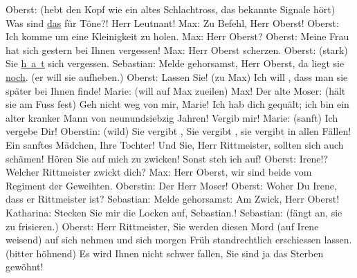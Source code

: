 \begin{ledgroupsized}[t]{13cm}
           \pstart
           Oberst: (hebt den Kopf wie ein altes Schlachtross, das bekannte Signale hört) Was
               sind \uline{das} für Töne?! Herr Leutnant!\pend
           \pstart
           Max: Zu Befehl, Herr Oberst!\pend
           \pstart
           Oberst: Ich komme um eine Kleinigkeit zu holen.\pend
           \pstart
           Max: Herr Oberst?\pend
           \pstart
           {\pb}Oberst: Meine Frau hat sich
               gestern bei Ihnen vergessen!\pend
           \pstart
           Max: Herr Oberst scherzen.\pend
           \pstart
           Oberst: (stark) Sie 
               \uline{h a t}
                sich vergessen.\pend
           \pstart
           Sebastian: Melde gehorsamst, Herr Oberst, da liegt sie \uline{noch}. (er will sie aufheben.)\pend
           \pstart
           Oberst: Lassen Sie! (zu Max) Ich will , dass man
               sie später bei Ihnen finde!\pend
           \pstart
           Marie: (will auf Max zueilen) Max!\pend
           \pstart
           Der alte Moser: (hält sie am Fuss fest) Geh nicht weg von mir, Marie! Ich hab dich
               gequält; ich bin ein alter kranker Mann von neunundsiebzig Jahren! Vergib mir!\pend
           \pstart
           Marie: (sanft) Ich vergebe Dir!\pend
           \pstart
           Oberstin: (wild) Sie vergibt , Sie vergibt , sie vergibt in allen Fällen! Ein sanftes Mädchen, Ihre
               Tochter! Und Sie, Herr Rittmeister, sollten sich auch schämen! Hören Sie auf mich zu
               zwicken! Sonst steh ich auf!\pend
           \pstart
           Oberst: Irene!? Welcher Rittmeister zwickt dich?\pend
           \pstart
           Max: Herr Oberst, wir sind beide vom Regiment der Geweihten.\pend
           \pstart
           Oberstin: Der Herr Moser!\pend
           \pstart
           Oberst: Woher \label{T_L01900-2v}\label{T_L01900-2h} Du Irene, dass er Rittmeister ist?\pend
           \pstart
           Sebastian: Melde gehorsamst: Am Zwick, Herr Oberst!\pend
           \pstart
           Katharina: Stecken Sie mir die Locken auf, Sebastian.!\pend
           \pstart
           Sebastian: (fängt an, sie zu frisieren.)\pend
           \pstart
           Oberst: Herr Rittmeister, Sie werden diesen Mord (auf Irene weisend) auf sich nehmen
               und sich morgen Früh standrechtlich erschiessen lassen. (bitter höhnend) Es wird
               Ihnen nicht schwer fallen, Sie sind ja das Sterben gewöhnt!\pend

\end{ledgroupsized}
